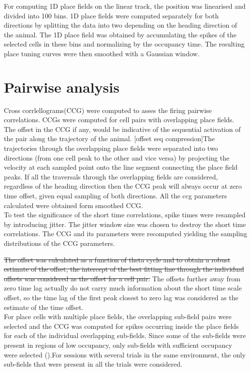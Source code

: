 For computing 1D place fields on the linear track, the position was linearised and divided into 100 bins.
1D place fields were computed separately for both directions by splitting the data into two depending on the heading direction of the animal. The 1D place field was obtained by accumulating the spikes of the selected cells in these bins and normalizing by the occupancy  time. The resulting place tuning curves were then smoothed with a Gaussian window.\\

\section{Pairwise analysis}
Cross corrlellograms(CCG) were computed to asses the firing pairwise correlations. CCGs were computed for cell pairs with overlapping place fields. The offset in the CCG if any, would be indicative of the sequential activation of the pair along the trajectory of the animal. [offset seq compression]The trajectories through the overlapping place fields were separated into two directions (from one cell peak to the other and vice versa) by projecting the velocity at each sampled point onto the line segment connecting the place field peaks. If all the traversals through the overlapping fields are considered, regardless of the heading direction then the CCG peak will always occur at zero time offset, given equal sampling of both directions. All the ccg parameters calculated were obtained form smoothed CCG. \\
To test the significance of the short time correlations, spike times were resampled by introducing jitter. The jitter window size was chosen to destroy the short time correlations. The CCG and its parameters were recomputed yielding the sampling distributions of the CCG parameters.

\st{The offset was calculated as a function of theta cycle and to obtain a robust estimate of the offset, the intercept of the best fitting line through the individual offsets was considered as the offset for a cell pair.} 
The offsets further away from zero time lag actually do not carry much information about the short time scale offset, so the time lag of the first peak closest to zero lag was considered as the estimate of the time  offset. \\
For place cells with multiple place fields, the overlapping sub-field pairs were selected and the CCG was computed for spikes occurring inside the place fields for each of the individual overlapping sub-fields. Since some of the sub-fields were present in regions of low occupancy, only sub-fields with sufficient occupancy were selected ().For sessions with several trials in the same environment, the only sub-fields that were present in all the trials were considered. \\ %

